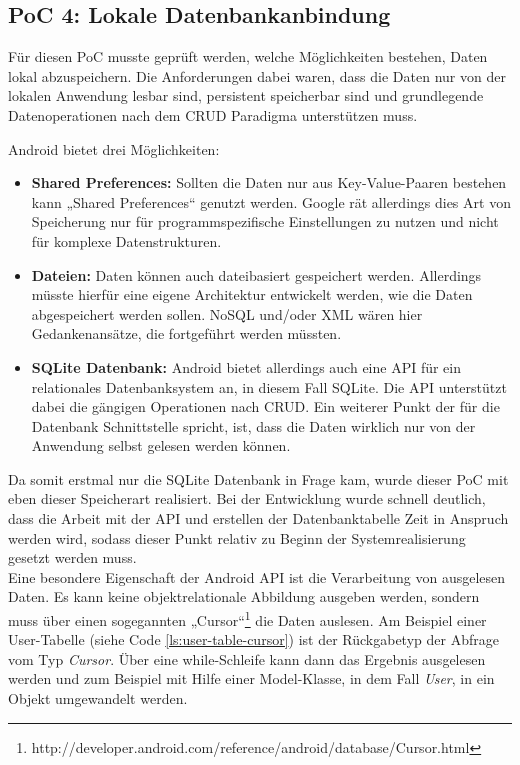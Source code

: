 \subsection{PoC 4: Lokale Datenbankanbindung}

Für diesen PoC musste geprüft werden, welche Möglichkeiten bestehen, Daten lokal abzuspeichern. Die Anforderungen dabei waren, dass die Daten nur von der lokalen Anwendung lesbar sind, persistent speicherbar sind und grundlegende Datenoperationen nach dem CRUD Paradigma unterstützen muss.

Android bietet drei Möglichkeiten:

\begin{itemize}
	\item \textbf{Shared Preferences:} Sollten die Daten nur aus Key-Value-Paaren bestehen kann „Shared Preferences“ genutzt werden. Google rät allerdings dies Art von Speicherung nur für programmspezifische Einstellungen zu nutzen und nicht für komplexe Datenstrukturen.
	\item \textbf{Dateien:} Daten können auch dateibasiert gespeichert werden. Allerdings müsste hierfür eine eigene Architektur entwickelt werden, wie die Daten abgespeichert werden sollen. NoSQL und/oder XML wären hier Gedankenansätze, die fortgeführt werden müssten.
	\item \textbf{SQLite Datenbank:} Android bietet allerdings auch eine API für ein relationales Datenbanksystem an, in diesem Fall SQLite. Die API unterstützt dabei die gängigen Operationen nach CRUD. Ein weiterer Punkt der für die Datenbank Schnittstelle spricht, ist, dass die Daten wirklich nur von der Anwendung selbst gelesen werden können.
\end{itemize}

Da somit erstmal nur die SQLite Datenbank in Frage kam, wurde dieser PoC mit eben dieser Speicherart realisiert. Bei der Entwicklung wurde schnell deutlich, dass die Arbeit mit der API und erstellen der Datenbanktabelle Zeit in Anspruch werden wird, sodass dieser Punkt relativ zu Beginn der Systemrealisierung gesetzt werden muss.\\

Eine besondere Eigenschaft der Android API ist die Verarbeitung von ausgelesen Daten. Es kann keine objektrelationale Abbildung ausgeben werden, sondern muss über einen sogegannten „Cursor“\footnote{http://developer.android.com/reference/android/database/Cursor.html} die Daten auslesen. Am Beispiel einer User-Tabelle (siehe Code \ref{ls:user-table-cursor}) ist der Rückgabetyp der Abfrage vom Typ \textit{Cursor}. Über eine while-Schleife kann dann das Ergebnis ausgelesen werden und zum Beispiel mit Hilfe einer Model-Klasse, in dem Fall \textit{User}, in ein Objekt umgewandelt werden.


